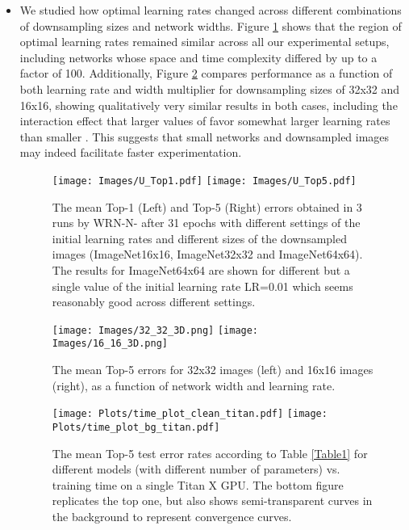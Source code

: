 \documentclass{article} \usepackage{iclr2017_conference,times}
\begin{document}
\begin{itemize}
\item We studied how optimal learning rates changed across different combinations of downsampling sizes and network widths. Figure \ref{Figure3} shows that the region of optimal learning rates remained similar across all our experimental setups, including networks whose space and time complexity differed by up to a factor of 100.
Additionally, Figure \ref{fig:three_d_plots} compares performance as a function of both learning rate and width multiplier  for downsampling sizes of 32x32 and 16x16, showing qualitatively very similar results in both cases, including the interaction effect that larger values of  favor somewhat larger learning rates than smaller . 
This suggests that small networks and 
downsampled images may indeed facilitate faster experimentation. 

\begin{figure}[tbp]
\begin{center}
\texttt{[image: Images/U\_Top1.pdf]}
\texttt{[image: Images/U\_Top5.pdf]}
\end{center}
\caption{The mean Top-1 (Left) and Top-5 (Right) errors obtained in 3 runs by WRN-N- after 31 epochs with different settings of the initial learning rates and different sizes of the downsampled images (ImageNet16x16, ImageNet32x32 and ImageNet64x64). The results for ImageNet64x64 are shown for different  but a single value of the initial learning rate LR=0.01 which seems reasonably good across different settings.\label{Figure3}}
\end{figure}


\begin{figure}[h]
\begin{center}
\texttt{[image: Images/32\_32\_3D.png]}
\texttt{[image: Images/16\_16\_3D.png]}
\end{center}
\caption{The mean Top-5 errors for 32x32 images (left) and 16x16 images (right), as a function of network width  and learning rate.\label{fig:three_d_plots}}
\end{figure}

\begin{figure}[tb]
\begin{center}
\texttt{[image: Plots/time\_plot\_clean\_titan.pdf]}
\texttt{[image: Plots/time\_plot\_bg\_titan.pdf]}
\end{center}
\caption{The mean Top-5 test error rates according to Table \ref{Table1} for different models (with different number of parameters) vs. training time on a single Titan X GPU. The bottom figure replicates the top one, but also shows semi-transparent curves in the background to represent convergence curves.}
\label{Figure4}
\end{figure}


\end{itemize}
\end{document}
